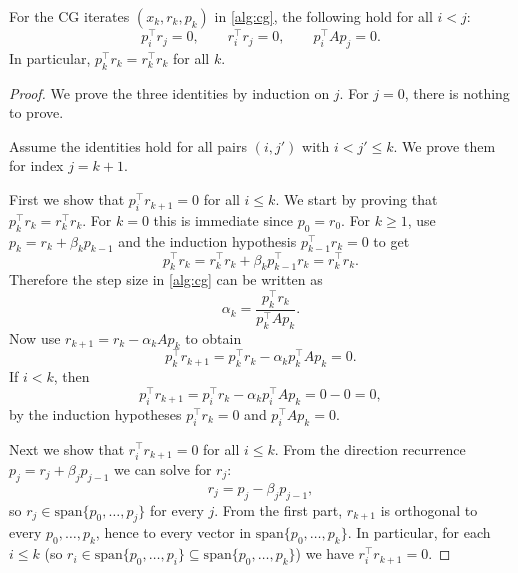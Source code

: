 \begin{lemma}
\label{lem:cg-orthogonality}
For the CG iterates $(x_k,r_k,p_k)$ in \cref{alg:cg}, the following hold for all $i<j$:
\[
  p_i^\top r_j = 0,
  \qquad
  r_i^\top r_j = 0,
  \qquad
  p_i^\top A p_j = 0.
\]
In particular, $p_k^\top r_k = r_k^\top r_k$ for all $k$.
\end{lemma}
\begin{proof}
We prove the three identities by induction on $j$.
For $j=0$, there is nothing to prove.

Assume the identities hold for all pairs $(i,j')$ with $i<j'\le k$.
We prove them for index $j=k+1$.

First we show that $p_i^\top r_{k+1}=0$ for all $i\le k$.
We start by proving that $p_k^\top r_k=r_k^\top r_k$.
For $k=0$ this is immediate since $p_0=r_0$.
For $k\ge 1$, use $p_k=r_k+\beta_k p_{k-1}$ and the induction hypothesis $p_{k-1}^\top r_k=0$ to get
\[
  p_k^\top r_k = r_k^\top r_k + \beta_k p_{k-1}^\top r_k = r_k^\top r_k.
\]
Therefore the step size in \cref{alg:cg} can be written as
\[
  \alpha_k=\frac{p_k^\top r_k}{p_k^\top A p_k}.
\]
Now use $r_{k+1}=r_k-\alpha_k A p_k$ to obtain
\[
  p_k^\top r_{k+1} = p_k^\top r_k - \alpha_k p_k^\top A p_k = 0.
\]
If $i<k$, then
\[
  p_i^\top r_{k+1} = p_i^\top r_k - \alpha_k p_i^\top A p_k = 0-0=0,
\]
by the induction hypotheses $p_i^\top r_k=0$ and $p_i^\top A p_k=0$.

Next we show that $r_i^\top r_{k+1}=0$ for all $i\le k$.
From the direction recurrence $p_j=r_j+\beta_j p_{j-1}$ we can solve for $r_j$:
\[
  r_j = p_j - \beta_j p_{j-1},
\]
so $r_j\in \mathrm{span}\{p_0,\dots,p_j\}$ for every $j$.
From the first part, $r_{k+1}$ is orthogonal to every $p_0,\dots,p_k$, hence to every vector in $\mathrm{span}\{p_0,\dots,p_k\}$.
In particular, for each $i\le k$ (so $r_i\in\mathrm{span}\{p_0,\dots,p_i\}\subseteq \mathrm{span}\{p_0,\dots,p_k\}$) we have $r_i^\top r_{k+1}=0$.


\end{proof}
